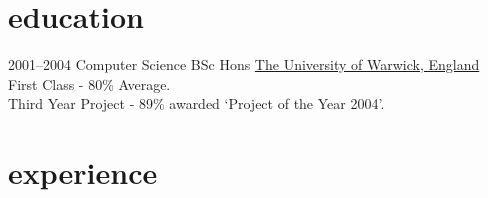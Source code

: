 \documentclass[]{friggeri-cv} %
\begin{document}
\section{education}

\begin{entrylist}
\entry
{2001--2004}
{Computer Science {\normalfont BSc Hons}}
{\href{http://www.warwick.ac.uk}{The University of Warwick, England}}
{First Class - 80\% Average.\\
Third Year Project - 89\% awarded `Project of the Year 2004'.}
\end{entrylist}


\section{experience}
\end{document}
